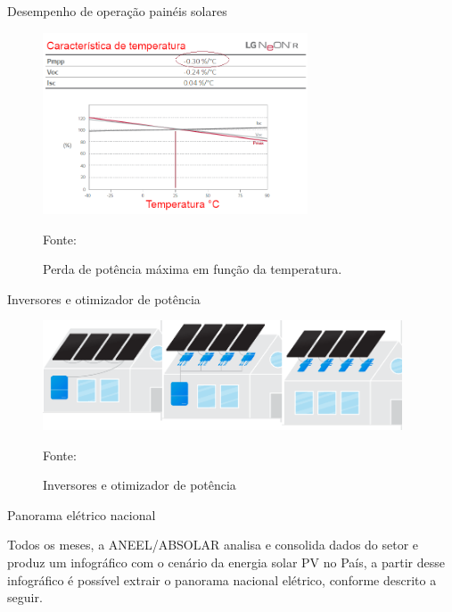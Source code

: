 \documentclass{beamer}
\begin{document}

\begin{frame}{Desempenho de operação painéis solares}

\begin{figure}[H]
    \centering
    \includegraphics[width=0.7\textwidth]{./Figuras/pv_temp.png}
    \caption{Perda de potência máxima em função da temperatura.}{Fonte: \cite{LG350Q1C}}
   \label{fig:pv_temp}
\end{figure}

\end{frame}


\begin{frame}{Inversores e otimizador de potência}

\begin{figure}[ht]
    \centering
    \includegraphics[width=0.95\textwidth]{./Figuras/inv_opt.png}
    \caption{Inversores e otimizador de potência}{Fonte: \cite{EnergySage}}
   \label{fig:opt}
\end{figure}

\end{frame}


\begin{frame}{Panorama elétrico nacional}

Todos os meses, a ANEEL/ABSOLAR \cite{ABSOLAR} analisa e consolida dados do setor e produz um infográfico com o cenário da energia solar PV no País, a partir desse infográfico é possível extrair o panorama nacional elétrico, conforme descrito a seguir.

\end{frame}
\end{document}
